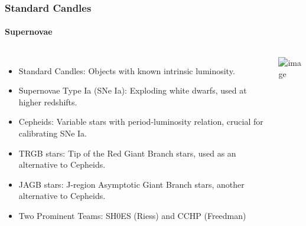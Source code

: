 \documentclass[aspectratio=169]{beamer}
\begin{document}
\begin{frame}
    \frametitle{Standard Candles}
    \framesubtitle{Supernovae}
    \begin{columns}
        \begin{itemize}
            \item<1-> Standard Candles: Objects with known intrinsic luminosity. \hfill {}
            \item<2-> Supernovae Type Ia (SNe Ia): Exploding white dwarfs, used at higher redshifts. \hfill {}
            \item<3-> Cepheids: Variable stars with period-luminosity relation, crucial for calibrating SNe Ia. \hfill {}
            \item<4-> TRGB stars: Tip of the Red Giant Branch stars, used as an alternative to Cepheids. \hfill {}
            \item<5-> JAGB stars: J-region Asymptotic Giant Branch stars, another alternative to Cepheids. \hfill {}
            \item<2-> Two Prominent Teams: SH0ES (Riess) and CCHP (Freedman)
        \end{itemize}
        \includegraphics<1>[width=\textwidth]{figures/candles.jpg}%
    \end{columns}
\end{frame}
\end{document}
